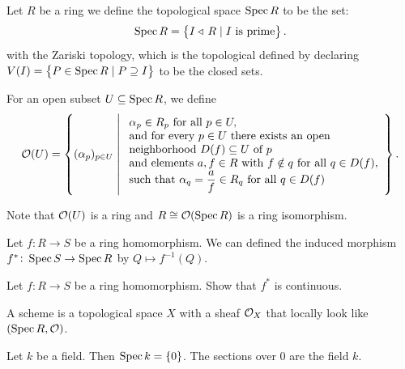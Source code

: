 \documentclass[11pt,a4paper]{article}
\begin{document}
\begin{definition}[Spec]
  Let $R$ be a ring we define the topological space $\operatorname{Spec} R$
  to be the set:
  \[
    \operatorname{Spec} R = \left\{I \triangleleft\, R \mid I \text{ is prime}\right\}.
  \]
  with the Zariski topology,
  which is the topological defined by declaring
  $V(I) = \left\{P \in \operatorname{Spec} R \mid P \supseteq I\right\}$ to be the closed
  sets.
\end{definition}

\begin{definition}
  For an open subset $U \subseteq \operatorname{Spec} R$, we define
  \[
    \mathcal{O}(U)
    =
    \left\{
      (\alpha_p)_{p \in U}
      \;\middle|\;
      \begin{array}{l}
        \alpha_p \in R_p \text{ for all } p \in U, \\
        \text{and for every } p \in U \text{ there exists an open } \\
        \text{neighborhood } D(f) \subseteq U \text{ of } p \\
        \text{and elements } a,f \in R \text{ with } f \notin q \text{ for all } q \in D(f), \\
        \text{such that } \alpha_q = \dfrac{a}{f} \in R_q \text{ for all } q \in D(f)
      \end{array}
    \right\}.
  \]
\end{definition}

\begin{remark}
  Note that $\mathcal{O}(U)$ is a ring and $R \cong \mathcal{O}(\operatorname{Spec} R)$ is a ring
  isomorphism.
\end{remark}

\begin{definition}
  Let $f \colon R \to S$ be a ring homomorphism.
  We can defined the induced morphism $f^* \colon \operatorname{Spec} S \to \operatorname{Spec} R$
  by $Q \mapsto f^{-1}(Q)$.
\end{definition}

\begin{exercise}
  Let $f \colon R \to S$ be a ring homomorphism.
  Show that $f^*$ is continuous.
\end{exercise}

\begin{definition}[Schemes]
  A scheme is a topological space $X$
  with a sheaf $\mathcal{O}_X$ that locally look like $(\operatorname{Spec} R,\mathcal{O})$.
\end{definition}

\begin{example}
  Let $k$ be a field.
  Then $\operatorname{Spec} k = \left\{0\right\}$.
  The sections over $0$ are the field $k$.
\end{example}

\begin{example}

\end{example}

\begin{example}

\end{example}

\begin{example}

\end{example}

\begin{example}

\end{example}
\end{document}
